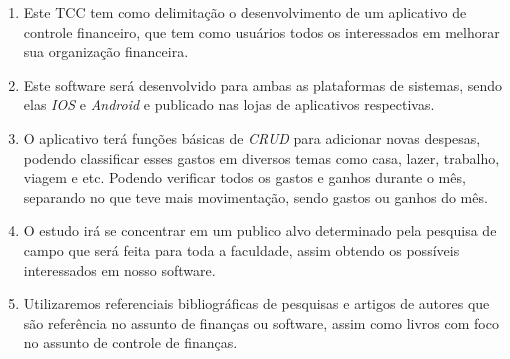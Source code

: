 \begin{enumerate}
    \item Este TCC tem como delimitação o desenvolvimento de um aplicativo de controle financeiro, que tem como usuários todos os interessados em melhorar sua organização financeira.
    \item Este software será desenvolvido para ambas as plataformas de sistemas, sendo elas \textit{IOS} e \textit{Android} e publicado nas lojas de aplicativos respectivas.
    \item O aplicativo terá funções básicas de \textit{CRUD} para adicionar novas despesas, podendo classificar esses gastos em diversos temas como casa, lazer, trabalho, viagem e etc. Podendo verificar todos os gastos e ganhos durante o mês, separando no que teve mais movimentação, sendo gastos ou ganhos do mês.
    \item O estudo irá se concentrar em um publico alvo determinado pela pesquisa de campo que será feita para toda a faculdade, assim obtendo os possíveis interessados em nosso software.
    \item Utilizaremos referenciais bibliográficas de pesquisas e artigos de autores que são referência no assunto de finanças ou software, assim como livros com foco no assunto de controle de finanças.
\end{enumerate}


